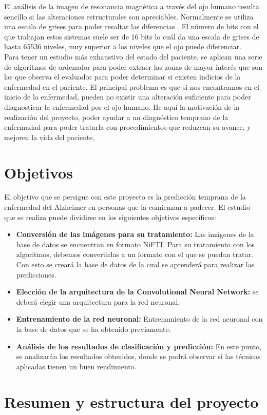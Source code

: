 El análisis de la imagen de resonancia magnética a través del ojo humano resulta sencillo si las alteraciones estructurales son apreciables. Normalmente se utiliza una escala de grises para poder resaltar las diferencias \cite{FormatosImagenes}. El número de bits con el que trabajan estos sistemas suele ser de 16 bits \cite{FormatosImagenes} lo cuál da una escala de grises de hasta 65536 niveles, muy superior a los niveles que el ojo puede diferenciar.\\
Para tener un estudio más exhaustivo del estado del paciente, se aplican una serie de algoritmos de ordenador para poder extraer las zonas de mayor interés que son las que observa el evaluador para poder determinar si existen indicios de la enfermedad en el paciente. El principal problema es que si nos encontramos en el inicio de la enfermedad, pueden no existir una alteración suficiente para poder diagnosticar la enfermedad por el ojo humano. He aquí la motivación de la realización del proyecto, poder ayudar a un diagnóstico temprano de la enfermadad para poder tratarla con procedimientos que reduzcan su avance, y mejoren la vida del paciente.

\section{Objetivos}

El objetivo que se persigue con este proyecto es la predicción temprana de la enfermedad del Alzheimer en personas que la comienzan a padecer. El estudio que se realiza puede dividirse en los siguientes objetivos específicos:
\begin{itemize}
	\item \textbf{Conversión de las imágenes para su tratamiento:} Las imágenes de la base de datos se encuentran en formato NiFTI. Para su tratamiento con los algoritmos, debemos convertirlas a un formato con el que se puedan tratar. Con esto se creará la base de datos de la cual se aprenderá para realizar las predicciones.
	\item \textbf{Elección de la arquitectura de la Convolutional Neural Network:} se deberá elegir una arquitectura para la red neuronal.
	\item \textbf{Entrenamiento de la red neuronal:} Entrenamiento de la red neuronal con la base de datos que se ha obtenido previamente.
	\item \textbf{Análisis de los resultados de clasificación y predicción:} En este punto, se analizarán los resultados obtenidos, donde se podrá observar si las técnicas aplicadas tienen un buen rendimiento.
\end{itemize}
\section{Resumen y estructura del proyecto}

